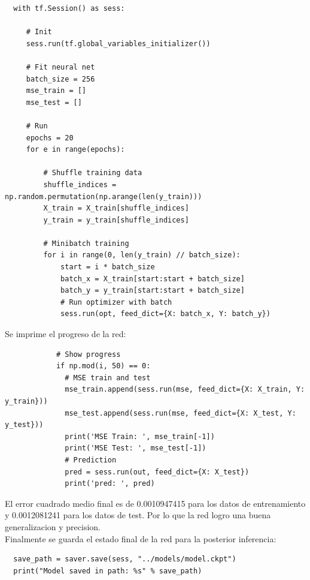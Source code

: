 \documentclass[osajnl,twocolumn,showpacs,superscriptaddress,10pt]{revtex4-1} %
\begin{document}
\begin{verbatim}
  with tf.Session() as sess:

     # Init
     sess.run(tf.global_variables_initializer())

     # Fit neural net
     batch_size = 256
     mse_train = []
     mse_test = []

     # Run
     epochs = 20
     for e in range(epochs):

         # Shuffle training data
         shuffle_indices = np.random.permutation(np.arange(len(y_train)))
         X_train = X_train[shuffle_indices]
         y_train = y_train[shuffle_indices]

         # Minibatch training
         for i in range(0, len(y_train) // batch_size):
             start = i * batch_size
             batch_x = X_train[start:start + batch_size]
             batch_y = y_train[start:start + batch_size]
             # Run optimizer with batch
             sess.run(opt, feed_dict={X: batch_x, Y: batch_y})
\end{verbatim}

Se imprime el progreso de la red:

\begin{verbatim}
            # Show progress
            if np.mod(i, 50) == 0:
              # MSE train and test
              mse_train.append(sess.run(mse, feed_dict={X: X_train, Y: y_train}))
              mse_test.append(sess.run(mse, feed_dict={X: X_test, Y: y_test}))
              print('MSE Train: ', mse_train[-1])
              print('MSE Test: ', mse_test[-1])
              # Prediction
              pred = sess.run(out, feed_dict={X: X_test})
              print('pred: ', pred)
\end{verbatim}

El error cuadrado medio final es de 0.0010947415 para los datos de entrenamiento y 0.0012081241 para los datos de test. Por lo que la red logro una buena generalizacion y precision. \\

Finalmente se guarda el estado final de la red para la posterior inferencia:

\begin{verbatim}
  save_path = saver.save(sess, "../models/model.ckpt")
  print("Model saved in path: %s" % save_path)
\end{verbatim}
\end{document}
